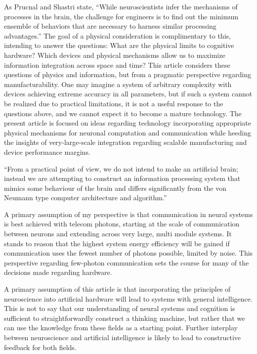 \vspace{3em}
As Prucnal and Shastri state, ``While neuroscientists infer the mechanisms of processes in the brain, the challenge for engineers is to find out the minimum ensemble of behaviors that are necessary to harness similar processing advantages.'' The goal of a physical consideration is complimentary to this, intending to answer the questions: What are the physical limits to cognitive hardware? Which devices and physical mechanisms allow us to maximize information integration across space and time? This article considers these questions of physics and information, but from a pragmatic perspective regarding manufacturability. One may imagine a system of arbitrary complexity with devices achieving extreme accuracy in all parameters, but if such a system cannot be realized due to practical limitations, it is not a useful response to the questions above, and we cannot expect it to become a mature technology. The present article is focused on ideas regarding technology incorporating appropriate physical mechanisms for neuronal computation and communication while heeding the insights of very-large-scale integration regarding scalable manufacturing and device performance margins. 

\vspace{3em}
\cite{juya1996} ``From a practical point of view, we do not intend to make an artificial brain; instead we are attempting to construct an information processing system that mimics some behaviour of the brain and differs significantly from the von Neumann type computer architecture and algorithm.''

\vspace{3em}
A primary assumption of my perspective is that communication in neural systems is best achieved with telecom photons, starting at the scale of communication between neurons and extending across very large, multi module systems. It stands to reason that the highest system energy efficiency will be gained if communication uses the fewest number of photons possible, limited by noise. This perspective regarding few-photon communication sets the course for many of the decisions made regarding hardware.

\vspace{3em}
A primary assumption of this article is that incorporating the principles of neuroscience into artificial hardware will lead to systems with general intelligence. This is not to say that our understanding of neural systems and cognition is sufficient to straightforwardly construct a thinking machine, but rather that we can use the knowledge from these fields as a starting point. Further interplay between neuroscience and artificial intelligence is likely to lead to constructive feedback for both fields.

